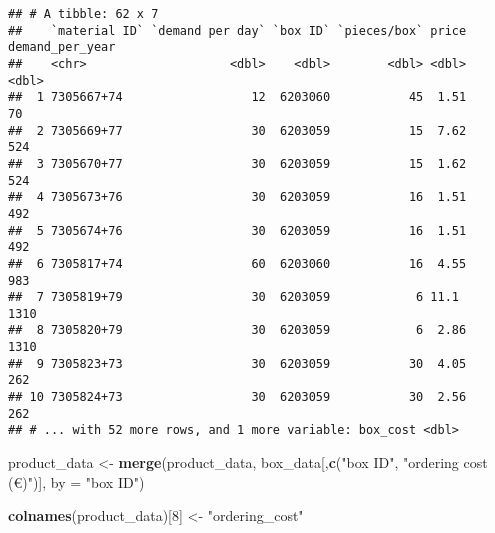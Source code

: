 \documentclass[
]{article}
\newenvironment{Shaded}{\begin{snugshade}}{\end{snugshade}}
\newcommand{\DataTypeTok}[1]{\textcolor[rgb]{0.13,0.29,0.53}{#1}}
\newcommand{\DecValTok}[1]{\textcolor[rgb]{0.00,0.00,0.81}{#1}}
\newcommand{\KeywordTok}[1]{\textcolor[rgb]{0.13,0.29,0.53}{\textbf{#1}}}
\newcommand{\NormalTok}[1]{#1}
\newcommand{\OperatorTok}[1]{\textcolor[rgb]{0.81,0.36,0.00}{\textbf{#1}}}
\newcommand{\StringTok}[1]{\textcolor[rgb]{0.31,0.60,0.02}{#1}}
\begin{document}
\begin{Shaded}
\end{Shaded}

\begin{verbatim}
## # A tibble: 62 x 7
##    `material ID` `demand per day` `box ID` `pieces/box` price demand_per_year
##    <chr>                    <dbl>    <dbl>        <dbl> <dbl>           <dbl>
##  1 7305667+74                  12  6203060           45  1.51              70
##  2 7305669+77                  30  6203059           15  7.62             524
##  3 7305670+77                  30  6203059           15  1.62             524
##  4 7305673+76                  30  6203059           16  1.51             492
##  5 7305674+76                  30  6203059           16  1.51             492
##  6 7305817+74                  60  6203060           16  4.55             983
##  7 7305819+79                  30  6203059            6 11.1             1310
##  8 7305820+79                  30  6203059            6  2.86            1310
##  9 7305823+73                  30  6203059           30  4.05             262
## 10 7305824+73                  30  6203059           30  2.56             262
## # ... with 52 more rows, and 1 more variable: box_cost <dbl>
\end{verbatim}

\begin{Shaded}
\begin{Highlighting}[]
\NormalTok{product_data <-}\StringTok{ }\KeywordTok{merge}\NormalTok{(product_data, box_data[,}\KeywordTok{c}\NormalTok{(}\StringTok{"box ID"}\NormalTok{, }\StringTok{"ordering cost (€)"}\NormalTok{)], }\DataTypeTok{by =} \StringTok{"box ID"}\NormalTok{)}

\KeywordTok{colnames}\NormalTok{(product_data)[}\DecValTok{8}\NormalTok{] <-}\StringTok{ "ordering_cost"}
\end{Highlighting}
\end{Shaded}
\end{document}
